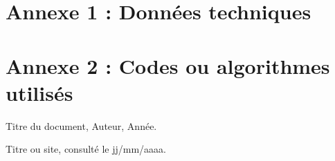\documentclass[12pt,a4paper]{report}
\begin{document}




\appendix

\section{Annexe 1 : Données techniques}
\section{Annexe 2 : Codes ou algorithmes utilisés}


\begin{thebibliography}{9}

Titre du document, Auteur, Année.


Titre ou site, consulté le jj/mm/aaaa.


\end{thebibliography}
\end{document}
